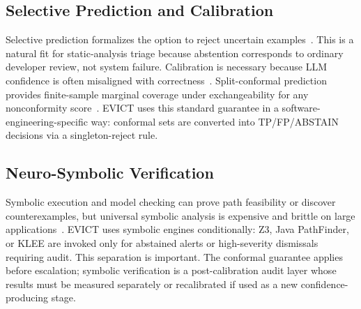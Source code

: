 \subsection{Selective Prediction and Calibration}

Selective prediction formalizes the option to reject uncertain examples~\cite{elyaniv2010,geifman2017}. This is a natural fit for static-analysis triage because abstention corresponds to ordinary developer review, not system failure. Calibration is necessary because LLM confidence is often misaligned with correctness~\cite{guo2017calibration,kadavath2022,guo2024calibration}. Split-conformal prediction provides finite-sample marginal coverage under exchangeability for any nonconformity score~\cite{vovk2005,angelopoulos2021}. EVICT uses this standard guarantee in a software-engineering-specific way: conformal sets are converted into TP/FP/ABSTAIN decisions via a singleton-reject rule.

\subsection{Neuro-Symbolic Verification}

Symbolic execution and model checking can prove path feasibility or discover counterexamples, but universal symbolic analysis is expensive and brittle on large applications~\cite{jpf2003,spf2013,klee2008,laurel2022}. EVICT uses symbolic engines conditionally: Z3, Java PathFinder, or KLEE are invoked only for abstained alerts or high-severity dismissals requiring audit. This separation is important. The conformal guarantee applies before escalation; symbolic verification is a post-calibration audit layer whose results must be measured separately or recalibrated if used as a new confidence-producing stage.
